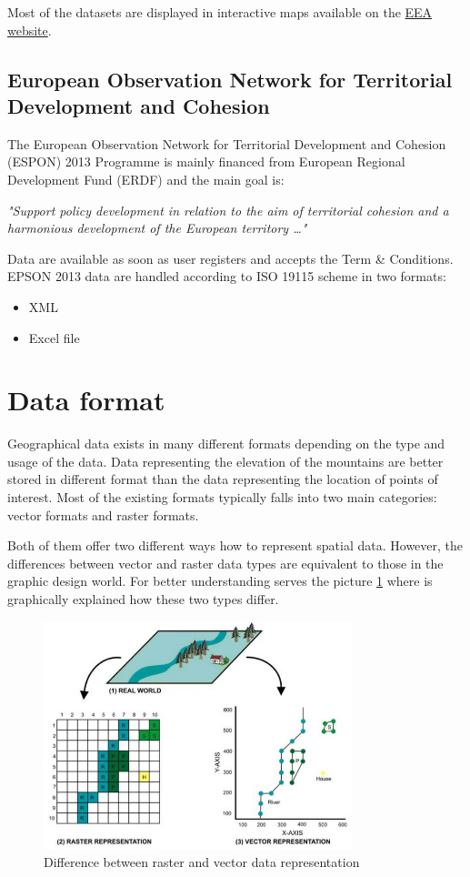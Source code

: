 \documentclass[thesis=M,english]{FITthesis}[2012/10/20]
\begin{document}
Most of the datasets are displayed in interactive maps available on the \href{http://www.eea.europa.eu/data-and-maps}{EEA website}.


\subsection{European Observation Network for Territorial Development and Cohesion}
The European Observation Network for Territorial Development and Cohesion (ESPON) 2013 Programme is mainly financed from European Regional Development Fund (ERDF) and the main goal is:

\textit{"Support policy development in relation to the aim of territorial cohesion and a harmonious development of the European territory \ldots "} \cite{ESPON13}

Data are available as soon as user registers and accepts the Term \& Conditions. EPSON 2013 data are handled according to ISO 19115 scheme in two formats:

\begin{itemize}
\item XML
\item Excel file
\end{itemize}

\section{Data format}
Geographical data exists in many different formats depending on the type and usage of the data. Data representing the elevation of the mountains are better stored in different format than the data representing the location of points of interest. 
Most of the existing formats typically falls into two main categories: vector formats and raster formats. 

Both of them offer two different ways how to represent spatial data. However, the differences between vector and raster data types are equivalent to those in the graphic design world. For better understanding serves the picture \ref{pic:RasterVector} where is graphically explained how these two types differ.

\begin{figure}[h]
\centering
\includegraphics[width=0.8\textwidth]{pics/RasterVectorPreview}
\caption{Difference between raster and vector data representation}
\label{pic:RasterVector}
\end{figure}
\end{document}
